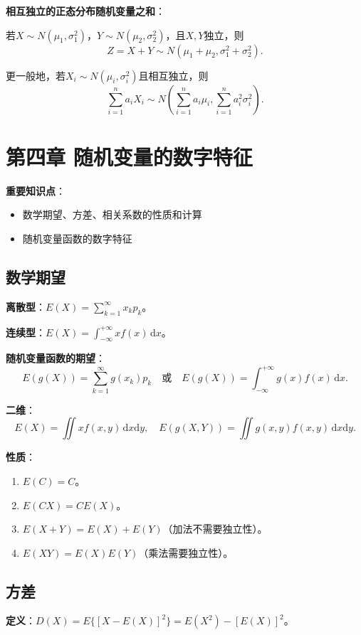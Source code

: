 \documentclass[11pt,a4paper]{report}
\theoremstyle{definition}
\theoremstyle{plain}
\begin{document}
\textbf{相互独立的正态分布随机变量之和}：

若$X\sim N(\mu_1,\sigma_1^2)$，$Y\sim N(\mu_2,\sigma_2^2)$，且$X,Y$独立，则
\[
Z=X+Y\sim N(\mu_1+\mu_2,\sigma_1^2+\sigma_2^2).
\]

更一般地，若$X_i\sim N(\mu_i,\sigma_i^2)$且相互独立，则
\[
\sum_{i=1}^{n}a_iX_i\sim N\left(\sum_{i=1}^{n}a_i\mu_i,\sum_{i=1}^{n}a_i^2\sigma_i^2\right).
\]

\section{第四章 随机变量的数字特征}

\textbf{重要知识点}：
\begin{itemize}[leftmargin=2em]
    \item 数学期望、方差、相关系数的性质和计算
    \item 随机变量函数的数字特征
\end{itemize}

\subsection{数学期望}

\textbf{离散型}：$E(X)=\sum_{k=1}^{\infty}x_kp_k$。

\textbf{连续型}：$E(X)=\int_{-\infty}^{+\infty}xf(x)\,\mathrm{d}x$。

\textbf{随机变量函数的期望}：
\[
E(g(X))=\sum_{k=1}^{\infty}g(x_k)p_k\quad\text{或}\quad
E(g(X))=\int_{-\infty}^{+\infty}g(x)f(x)\,\mathrm{d}x.
\]

\textbf{二维}：
\[
E(X)=\iint xf(x,y)\,\mathrm{d}x\mathrm{d}y,\quad
E(g(X,Y))=\iint g(x,y)f(x,y)\,\mathrm{d}x\mathrm{d}y.
\]

\textbf{性质}：
\begin{enumerate}[label=\arabic*.,leftmargin=2em]
    \item $E(C)=C$。
    \item $E(CX)=CE(X)$。
    \item $E(X+Y)=E(X)+E(Y)$（加法不需要独立性）。
    \item $E(XY)=E(X)E(Y)$（乘法需要独立性）。
\end{enumerate}

\subsection{方差}

\textbf{定义}：$D(X)=E\{[X-E(X)]^2\}=E(X^2)-[E(X)]^2$。
\end{document}
